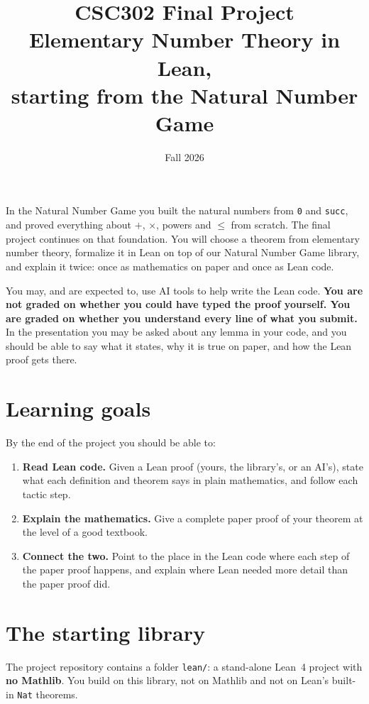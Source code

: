 \documentclass[11pt]{article}
\title{\textbf{CSC302 Final Project}\\[2pt]\large Elementary Number Theory in Lean,\\
starting from the Natural Number Game}
\date{Fall 2026}
\author{}
\newcommand{\lean}[1]{\texttt{#1}}
\begin{document}
\maketitle
\vspace{-2em}

In the Natural Number Game you built the natural numbers from \lean{0} and \lean{succ}, and
proved everything about $+$, $\times$, powers and $\le$ from scratch. The final project
continues on that foundation. You will choose a theorem from elementary number theory,
formalize it in Lean on top of our Natural Number Game library, and explain it twice: once as
mathematics on paper and once as Lean code.

You may, and are expected to, use AI tools to help write the Lean code. \textbf{You are not
graded on whether you could have typed the proof yourself. You are graded on whether you
understand every line of what you submit.} In the presentation you may be asked about any
lemma in your code, and you should be able to say what it states, why it is true on paper, and
how the Lean proof gets there.

\tableofcontents

\section{Learning goals}

By the end of the project you should be able to:
\begin{enumerate}
\item \textbf{Read Lean code.} Given a Lean proof (yours, the library's, or an AI's), state what
  each definition and theorem says in plain mathematics, and follow each tactic step.
\item \textbf{Explain the mathematics.} Give a complete paper proof of your theorem at the level
  of a good textbook.
\item \textbf{Connect the two.} Point to the place in the Lean code where each step of the paper
  proof happens, and explain where Lean needed more detail than the paper proof did.
\end{enumerate}

\section{The starting library}

The project repository contains a folder \lean{lean/}: a stand-alone Lean~4 project with
\textbf{no Mathlib}. You build on this library, not on Mathlib and not on Lean's built-in
\lean{Nat} theorems.
\end{document}
